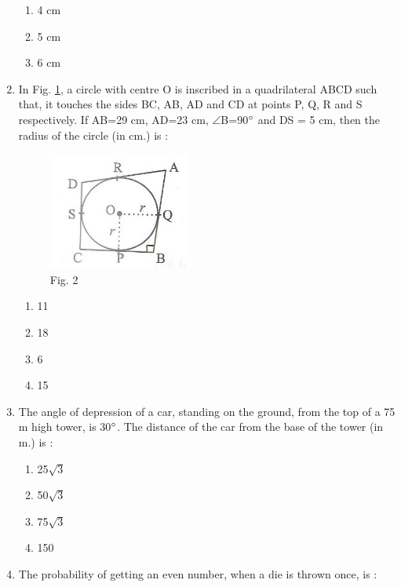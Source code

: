 \documentclass[journal,12pt,twocolumn]{IEEEtran}
\renewcommand\thesection{\arabic{section}}
\begin{document}
\begin{enumerate}[label=\thesection.\arabic*.,ref=\thesection.\theenumi]
\begin{enumerate}
    \item 4 cm\\
    \item 5 cm\\
    \item 6 cm
 \end{enumerate}
\item In Fig. \ref{fig2}, a circle with centre O is inscribed in a quadrilateral ABCD such
that, it touches the sides BC, AB, AD and CD at points P, Q, R and S respectively. If AB=29 cm, AD=23 cm, $\angle$B=90$\degree$ and DS = 5 cm, then the radius of the circle (in cm.) is : \\
		\begin{figure}
			\centering
\includegraphics[width=\columnwidth]{2.png}
\caption{Fig. 2}
\label{fig2}
		\end{figure}
 \begin{enumerate}
    \item 11\\
    \item 18\\
    \item 6\\
    \item 15
 \end{enumerate}
\item The angle of depression of a car, standing on the ground, from the top of a
75 m high tower, is 30$\degree$. The distance of the car from the base of the tower
(in m.) is : \\
 \begin{enumerate}
    \item 25$\sqrt{3}$\\
    \item 50$\sqrt{3}$\\
    \item 75$\sqrt{3}$\\
    \item 150
 \end{enumerate}
\item  The probability of getting an even number, when a die is thrown once, is :


\end{enumerate}
\end{document}
